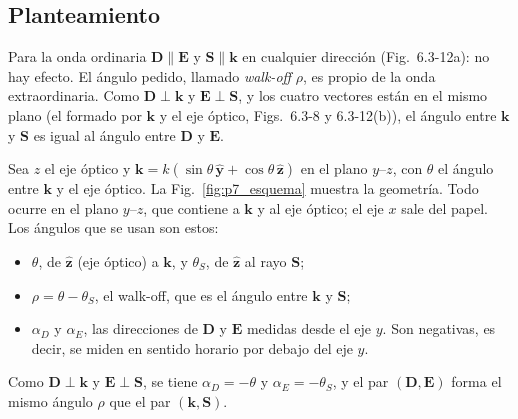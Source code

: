 \documentclass{article}
\newcommand{\yh}{\hat{\mathbf{y}}}
\newcommand{\zh}{\hat{\mathbf{z}}}
\newcommand{\kv}{\mathbf{k}}
\newcommand{\Sv}{\mathbf{S}}
\newcommand{\Ev}{\mathbf{E}}
\newcommand{\Dv}{\mathbf{D}}
\begin{document}
\subsection*{Planteamiento}

Para la onda ordinaria $\Dv\parallel\Ev$ y $\Sv\parallel\kv$ en cualquier dirección (Fig.~6.3-12a):
no hay efecto. El ángulo pedido, llamado \emph{walk-off} $\rho$, es propio de la onda
extraordinaria. Como $\Dv\perp\kv$ y $\Ev\perp\Sv$, y los cuatro vectores están en el mismo plano
(el formado por $\kv$ y el eje óptico, Figs.~6.3-8 y 6.3-12(b)), el ángulo entre $\kv$ y $\Sv$ es igual al
ángulo entre $\Dv$ y $\Ev$.

Sea $z$ el eje óptico y $\kv=k(\sin\theta\,\yh+\cos\theta\,\zh)$ en el plano $y$--$z$, con
$\theta$ el ángulo entre $\kv$ y el eje óptico. La Fig.~\ref{fig:p7_esquema} muestra la
geometría. Todo ocurre en el plano $y$--$z$, que contiene a $\kv$ y al eje óptico; el eje $x$
sale del papel. Los ángulos que se usan son estos:
\begin{itemize}
\item $\theta$, de $\zh$ (eje óptico) a $\kv$, y $\theta_S$, de $\zh$ al rayo $\Sv$;
\item $\rho=\theta-\theta_S$, el walk-off, que es el ángulo entre $\kv$ y $\Sv$;
\item $\alpha_D$ y $\alpha_E$, las direcciones de $\Dv$ y $\Ev$ medidas desde el eje $y$. Son
  negativas, es decir, se miden en sentido horario por debajo del eje $y$.
\end{itemize}
Como $\Dv\perp\kv$ y $\Ev\perp\Sv$, se tiene $\alpha_D=-\theta$ y $\alpha_E=-\theta_S$, y el par
$(\Dv,\Ev)$ forma el mismo ángulo $\rho$ que el par $(\kv,\Sv)$.
\end{document}
